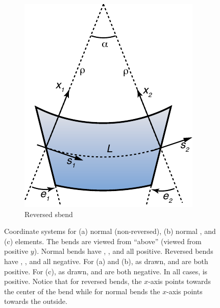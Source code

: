 \begin{figure}[tb]
\begin{subfigure}[b]{0.32\textwidth}
    \includegraphics{sbend-rev.pdf}
    \caption{Reversed sbend}
    \label{f:sbend.rev}
  \end{subfigure}
  \hfill
  \caption[Coordinate systems for rbend and sbend elements.]
{Coordinate systems for (a) normal (non-reversed), (b) normal , and (c)
 elements. The bends are viewed from ``above'' (viewed from positive $y$).
Normal bends have , , and  all positive. Reversed bends have ,
, and  all negative. For (a) and (b), as drawn,  and  are both
positive. For (c), as drawn,  and  are both negative. In all cases,  is
positive. Notice that for reversed bends, the $x$-axis points towards the center of the bend while
for normal bends the $x$-axis points towards the outside.}
  \label{f:bend}
\end{figure}

